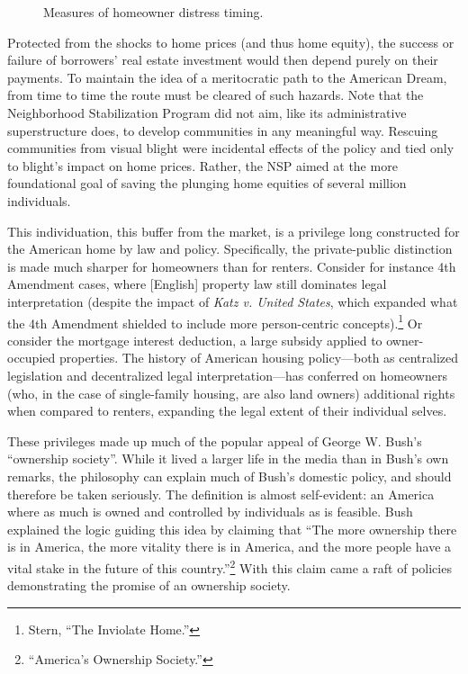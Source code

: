 \documentclass[
]{article}
\begin{document}
\begin{figure}

{\centering {}

}

\caption{Measures of homeowner distress timing.}\label{fig:distress}
\end{figure}

Protected from the shocks to home prices (and thus home equity), the success or failure of borrowers' real estate investment would then depend purely on their payments.
To maintain the idea of a meritocratic path to the American Dream, from time to time the route must be cleared of such hazards.
Note that the Neighborhood Stabilization Program did not aim, like its administrative superstructure does, to develop communities in any meaningful way.
Rescuing communities from visual blight were incidental effects of the policy and tied only to blight's impact on home prices.
Rather, the NSP aimed at the more foundational goal of saving the plunging home equities of several million individuals.

This individuation, this buffer from the market, is a privilege long constructed for the American home by law and policy.
Specifically, the private-public distinction is made much sharper for homeowners than for renters.
Consider for instance 4th Amendment cases, where {[}English{]} property law still dominates legal interpretation (despite the impact of \emph{Katz v. United States}, which expanded what the 4th Amendment shielded to include more person-centric concepts).\footnote{Stern, ``The Inviolate Home.''}
Or consider the mortgage interest deduction, a large subsidy applied to owner-occupied properties.
The history of American housing policy---both as centralized legislation and decentralized legal interpretation---has conferred on homeowners (who, in the case of single-family housing, are also land owners) additional rights when compared to renters, expanding the legal extent of their individual selves.

These privileges made up much of the popular appeal of George W. Bush's ``ownership society''.
While it lived a larger life in the media than in Bush's own remarks, the philosophy can explain much of Bush's domestic policy, and should therefore be taken seriously.
The definition is almost self-evident: an America where as much is owned and controlled by individuals as is feasible.
Bush explained the logic guiding this idea by claiming that ``The more ownership there is in America, the more vitality there is in America, and the more people have a vital stake in the future of this country.''\footnote{``America's Ownership Society.''}
With this claim came a raft of policies demonstrating the promise of an ownership society.
\end{document}
